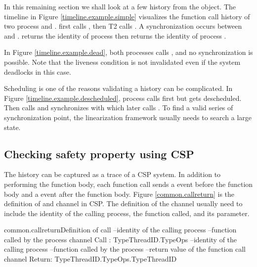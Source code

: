 \documentclass{article}
\begin{document}
In this remaining section we shall look at a few history from the  object. The timeline in Figure \ref{timeline.example.simple} visualizes the function call history of two process  and .  first calls , then T2 calls . A synchronization occurs between  and .  returns the identity of process  then  returns the identity of process .

In Figure \ref{timeline.example.dead}, both processes calls , and no synchronization is possible. Note that the liveness condition is not invalidated even if the system deadlocks in this case.

Scheduling is one of the reasons validating a history can be complicated. In Figure \ref{timeline.example.descheduled}, process  calls  first but gets descheduled. Then  calls  and synchronizes with  which later calls . To find a valid series of synchronization point, the linearization framework usually needs to search a large state. 

\subsection{Checking safety property using CSP} 
The history can be captured as a trace of a CSP system. In addition to performing the function body, each function call sends a  event before the function body and a  event after the function body. Figure \ref{common.callreturn} is the definition of  and  channel in CSP. The definition of the channel usually need to include the identity of the calling process, the function called, and its parameter. 

\begin{cspinline}{common.callreturn}{Definition of call}
--identity of the calling process
--function called by the process
channel Call : TypeThreadID.TypeOps
--identity of the calling process
--function called by the process
--return value of the function call
channel Return: TypeThreadID.TypeOps.TypeThreadID
\end{cspinline}
\end{document}
